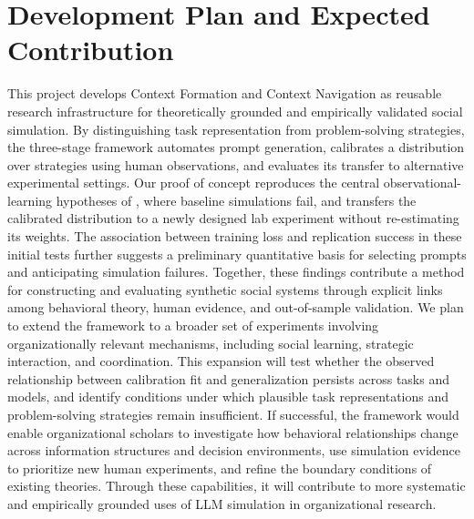 \documentclass[12pt,letterpaper]{article}
\begin{document}
\section*{\normalsize Development Plan and Expected Contribution}
This project develops Context Formation and Context Navigation as reusable research infrastructure for theoretically grounded and empirically validated social simulation. By distinguishing task representation from problem-solving strategies, the three-stage framework automates prompt generation, calibrates a distribution over strategies using human observations, and evaluates its transfer to alternative experimental settings. Our proof of concept reproduces the central observational-learning hypotheses of \citet{kremer2016}, where baseline simulations fail, and transfers the calibrated distribution to a newly designed lab experiment without re-estimating its weights. The association between training loss and replication success in these initial tests further suggests a preliminary quantitative basis for selecting prompts and anticipating simulation failures. Together, these findings contribute a method for constructing and evaluating synthetic social systems through explicit links among behavioral theory, human evidence, and out-of-sample validation. We plan to extend the framework to a broader set of experiments involving organizationally relevant mechanisms, including social learning, strategic interaction, and coordination. This expansion will test whether the observed relationship between calibration fit and generalization persists across tasks and models, and identify conditions under which plausible task representations and problem-solving strategies remain insufficient. If successful, the framework would enable organizational scholars to investigate how behavioral relationships change across information structures and decision environments, use simulation evidence to prioritize new human experiments, and refine the boundary conditions of existing theories. Through these capabilities, it will contribute to more systematic and empirically grounded uses of LLM simulation in organizational research.

\clearpage
\begingroup
\singlespacing


\endgroup

\clearpage
\appendix

\renewcommand{\thesection}{Appendix \Alph{section}:}
\renewcommand{\thesubsection}{\Alph{section}.\arabic{subsection}}
\end{document}
